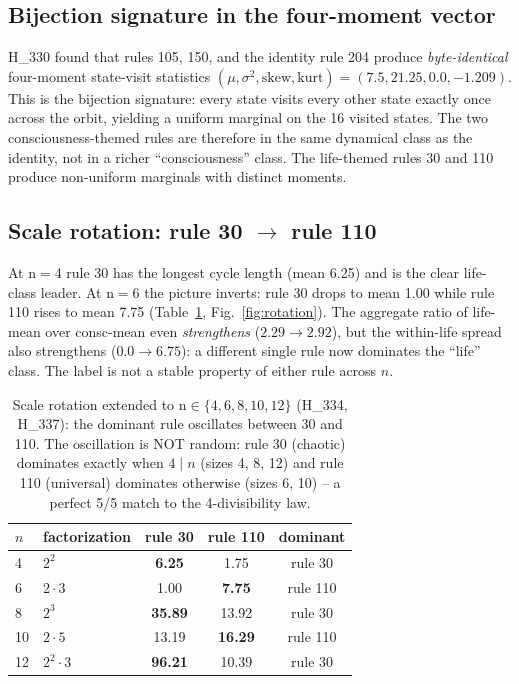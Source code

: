 \documentclass[11pt,a4paper]{article}
\begin{document}
\subsection{Bijection signature in the four-moment vector}
\label{sec:bijection}
H\_330 found that rules 105, 150, and the identity rule 204 produce
\emph{byte-identical} four-moment state-visit statistics
$(\mu, \sigma^2, \mathrm{skew}, \mathrm{kurt}) = (7.5, 21.25, 0.0, -1.209)$.
This is the bijection signature: every state visits every other state
exactly once across the orbit, yielding a uniform marginal on the 16
visited states. The two consciousness-themed rules are therefore in
the same dynamical class as the identity, not in a richer
``consciousness'' class. The life-themed rules 30 and 110 produce
non-uniform marginals with distinct moments.

\subsection{Scale rotation: rule \textsc{30} $\to$ rule \textsc{110}}
\label{sec:scale-rotation}
At n$=$4 rule 30 has the longest cycle length (mean 6.25) and is the
clear life-class leader. At n$=$6 the picture inverts: rule 30 drops
to mean 1.00 while rule 110 rises to mean 7.75 (Table~\ref{tab:rotation},
Fig.~\ref{fig:rotation}). The aggregate
ratio of life-mean over consc-mean even \emph{strengthens}
($2.29 \to 2.92$), but the within-life spread also strengthens
($0.0 \to 6.75$): a different single rule now dominates the
``life'' class. The label is not a stable property of either
rule across $n$.

\begin{table}[h]
\centering
\small
\begin{tabular}{llccc}
\toprule
\textbf{$n$} & \textbf{factorization} & \textbf{rule 30} & \textbf{rule 110}
& \textbf{dominant} \\
\midrule
4  & $2^2$    & \textbf{6.25}  & 1.75   & rule 30  \\
6  & $2{\cdot}3$ & 1.00        & \textbf{7.75}  & rule 110 \\
8  & $2^3$    & \textbf{35.89} & 13.92  & rule 30  \\
10 & $2{\cdot}5$ & 13.19       & \textbf{16.29} & rule 110 \\
12 & $2^2{\cdot}3$ & \textbf{96.21} & 10.39 & rule 30 \\
\bottomrule
\end{tabular}
\caption{Scale rotation extended to n$\in\{4,6,8,10,12\}$ (H\_334, H\_337):
the dominant rule oscillates between \textsc{30} and \textsc{110}. The
oscillation is NOT random: rule \textsc{30} (chaotic) dominates exactly
when $4 \mid n$ (sizes 4, 8, 12) and rule \textsc{110} (universal)
dominates otherwise (sizes 6, 10) -- a perfect 5/5 match to the
4-divisibility law.}
\label{tab:rotation}
\end{table}
\end{document}
